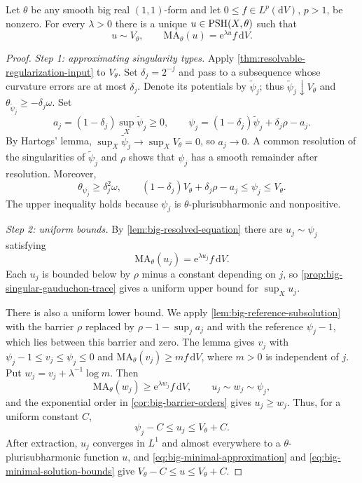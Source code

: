 \begin{theorem}\label{thm:big-minimal-exponential}
Let $\theta$ be any smooth big real $(1,1)$-form and let $0\leq f\in L^p(\mathrm{d}V)$, $p>1$, be nonzero. For every $\lambda>0$ there is a unique $u\in\mathrm{PSH}(X,\theta)$ such that
\[
 u\sim V_\theta,\qquad
 \mathrm{MA}_\theta(u)=\mathrm{e}^{\lambda u}f\,\mathrm{d}V.
\]
\end{theorem}
\begin{proof}
\emph{Step 1: approximating singularity types.} Apply \cref{thm:resolvable-regularization-input} to $V_\theta$. Set $\delta_j=2^{-j}$ and pass to a subsequence whose curvature errors are at most $\delta_j$. Denote its potentials by $\widetilde\psi_j$; thus $\widetilde\psi_j\downarrow V_\theta$ and $\theta_{\widetilde\psi_j}\geq-\delta_j\omega$. Set
\[
 a_j=(1-\delta_j)\sup_X\widetilde\psi_j\geq0,
 \qquad
 \psi_j=(1-\delta_j)\widetilde\psi_j+\delta_j\rho-a_j.
\]
By Hartogs' lemma, $\sup_X\widetilde\psi_j\to\sup_XV_\theta=0$, so $a_j\to0$. A common resolution of the singularities of $\widetilde\psi_j$ and $\rho$ shows that $\psi_j$ has a smooth remainder after resolution. Moreover,
\begin{equation}\label{eq:big-minimal-approximation}
 \theta_{\psi_j}\geq\delta_j^2\omega,
 \qquad
 (1-\delta_j)V_\theta+\delta_j\rho-a_j
 \leq\psi_j\leq V_\theta.
\end{equation}
The upper inequality holds because $\psi_j$ is $\theta$-plurisubharmonic and nonpositive.

\emph{Step 2: uniform bounds.} By \cref{lem:big-resolved-equation} there are $u_j\sim\psi_j$ satisfying
\[
 \mathrm{MA}_\theta(u_j)=\mathrm{e}^{\lambda u_j}f\,\mathrm{d}V.
\]
Each $u_j$ is bounded below by $\rho$ minus a constant depending on $j$, so \cref{prop:big-singular-gauduchon-trace} gives a uniform upper bound for $\sup_Xu_j$.

There is also a uniform lower bound. We apply \cref{lem:big-reference-subsolution} with the barrier $\rho$ replaced by $\rho-1-\sup_ja_j$ and with the reference $\psi_j-1$, which lies between this barrier and zero. The lemma gives $v_j$ with $\psi_j-1\leq v_j\leq\psi_j\leq0$ and $\mathrm{MA}_\theta(v_j)\geq mf\,\mathrm{d}V$, where $m>0$ is independent of $j$. Put $w_j=v_j+\lambda^{-1}\log m$. Then
\[
 \mathrm{MA}_\theta(w_j)\geq \mathrm{e}^{\lambda w_j}f\,\mathrm{d}V,
 \qquad u_j\sim w_j\sim\psi_j,
\]
and the exponential order in \cref{cor:big-barrier-orders} gives $u_j\geq w_j$. Thus, for a uniform constant $C$,
\begin{equation}\label{eq:big-minimal-solution-bounds}
 \psi_j-C\leq u_j\leq V_\theta+C.
\end{equation}
After extraction, $u_j$ converges in $L^1$ and almost everywhere to a $\theta$-plurisubharmonic function $u$, and \eqref{eq:big-minimal-approximation} and \eqref{eq:big-minimal-solution-bounds} give $V_\theta-C\leq u\leq V_\theta+C$.


\end{proof}
